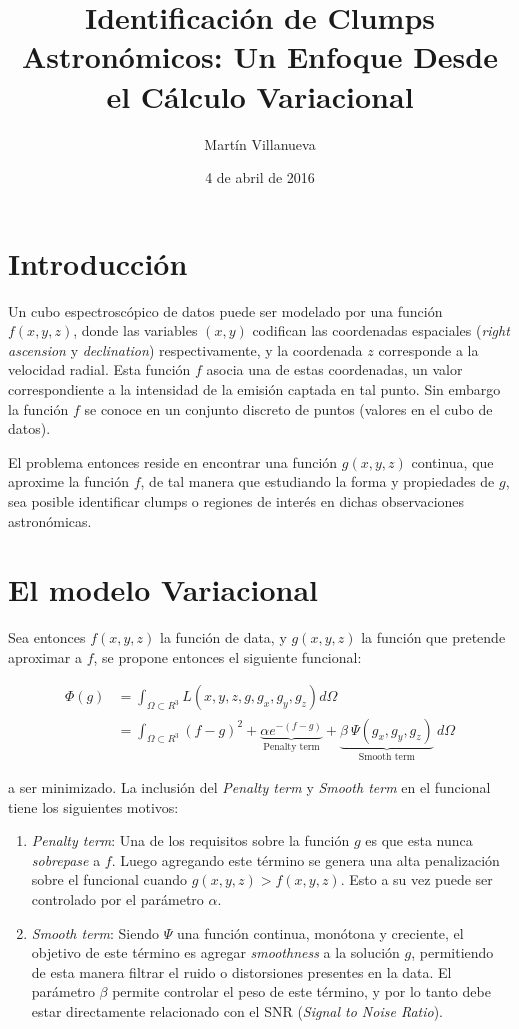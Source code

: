 \documentclass[spanish, fleqn]{article}
\title{Identificación de Clumps Astronómicos: Un Enfoque Desde el Cálculo Variacional}
\author{Martín Villanueva}
\date{4 de abril de 2016}
\begin{document}
\maketitle


\section{Introducción}
Un cubo espectroscópico de datos puede ser modelado por una función $f(x,y,z)$, donde
las variables $(x,y)$ codifican las coordenadas espaciales (\textit{right ascension} y
\textit{declination}) respectivamente, y la coordenada $z$ corresponde a la velocidad
radial. Esta función $f$ asocia una de estas coordenadas, un valor correspondiente a la
intensidad de la emisión captada en tal punto. Sin embargo la función $f$ se conoce en
un conjunto discreto de puntos (valores en el cubo de datos).

El problema entonces reside en encontrar una función $g(x,y,z)$ continua, que aproxime
la función $f$, de tal manera que estudiando la forma y propiedades de $g$, sea posible
identificar clumps o regiones de interés en dichas observaciones astronómicas.  

\section{El modelo Variacional}

Sea entonces $f(x,y,z)$ la función de data, y $g(x,y,z)$ la función que pretende aproximar
a $f$, se propone entonces el siguiente funcional:

\begin{equation} \label{eq1}
\begin{split}
\Phi(g) & = \int_{\Omega \subset R^3} L(x, y , z , g , g_x, g_y, g_z) d\Omega \\
        & = \int_{\Omega \subset R^3} (f-g)^2 +\underbrace{\alpha e^{-(f-g)}}_{\text{Penalty term}}
        + \underbrace{\beta \ \Psi(g_x, g_y, g_z)}_{\text{Smooth term}} \ d\Omega
\end{split}
\end{equation}

\noindent a ser minimizado. La inclusión del \textit{Penalty term} y \textit{Smooth term} en el funcional
tiene los siguientes motivos:

\begin{enumerate}
    \item \textit{Penalty term}: Una de los requisitos sobre la función $g$ es que esta nunca \textit{sobrepase}
    a $f$. Luego agregando este término se genera una alta penalización sobre el funcional cuando $g(x,y,z) > f(x,y,z)$.
    Esto a su vez puede ser controlado por el parámetro $\alpha$.
    \item \textit{Smooth term}: Siendo $\Psi$ una función continua, monótona y creciente, el objetivo de este término
    es agregar \textit{smoothness} a la solución $g$, permitiendo de esta manera filtrar el ruido o distorsiones presentes
    en la data. El parámetro $\beta$ permite controlar el peso de este término, y por lo tanto debe estar directamente
    relacionado con el SNR (\textit{Signal to Noise Ratio}).
\end{enumerate}
\end{document}
